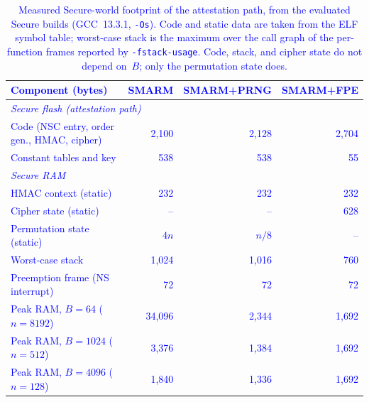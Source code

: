 \documentclass[journal]{IEEEtran}
\newcommand\ben[1]{\textcolor{blue}{#1}}
\newcommand{\rtsmarmone}{SMARM+PRNG\xspace}
\newcommand{\rtsmarmtwo}{SMARM+FPE\xspace}
\begin{document}
\begin{table}[!ht]
  \centering
  \small
  \setlength{\tabcolsep}{4pt}
  \ben{%
  \begin{tabular}{lrrr}
    \toprule
    \textbf{Component (bytes)} & \textbf{SMARM} & \textbf{\rtsmarmone} & \textbf{\rtsmarmtwo} \\
    \midrule
    \multicolumn{4}{l}{\emph{Secure flash (attestation path)}} \\
    Code (NSC entry, order gen., HMAC, cipher) & 2{,}100 & 2{,}128 & 2{,}704 \\
    Constant tables and key & 538 & 538 & 55 \\
    \midrule
    \multicolumn{4}{l}{\emph{Secure RAM}} \\
    HMAC context (static) & 232 & 232 & 232 \\
    Cipher state (static) & -- & -- & 628 \\
    Permutation state (static) & $4n$ & $n/8$ & -- \\
    Worst-case stack & 1{,}024 & 1{,}016 & 760 \\
    Preemption frame (NS interrupt) & 72 & 72 & 72 \\
    \midrule
    Peak RAM, $B = 64$ ($n = 8192$) & 34{,}096 & 2{,}344 & 1{,}692 \\
    \rowcolor{gray!15}
    Peak RAM, $B = 1024$ ($n = 512$) & 3{,}376 & 1{,}384 & 1{,}692 \\
    Peak RAM, $B = 4096$ ($n = 128$) & 1{,}840 & 1{,}336 & 1{,}692 \\
    \bottomrule
  \end{tabular}}
  \caption{\ben{Measured Secure-world footprint of the attestation path, from the evaluated Secure builds (GCC~13.3.1, \texttt{-Os}). Code and static data are taken from the ELF symbol table; worst-case stack is the maximum over the call graph of the per-function frames reported by \texttt{-fstack-usage}. Code, stack, and cipher state do not depend on~$B$; only the permutation state does.}}
  \label{tab:footprint}
\end{table}
\end{document}

